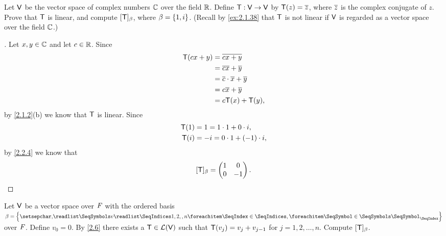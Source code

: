 \begin{ex}\label{ex:2.2.9}
  Let \(\mathsf{V}\) be the vector space of complex numbers \(\mathbb{C}\) over the field \(\mathbb{R}\).
  Define \(\mathsf{T} : \mathsf{V} \to \mathsf{V}\) by \(\mathsf{T}(z) = \overline{z}\), where \(\overline{z}\) is the complex conjugate of \(z\).
  Prove that \(\mathsf{T}\) is linear, and compute \([\mathsf{T}]_{\beta}\), where \(\beta = \left\lbrace1, i\right\rbrace\).
  (Recall by \cref{ex:2.1.38} that \(\mathsf{T}\) is not linear if \(\mathsf{V}\) is regarded as a vector space over the field \(\mathbb{C}\).)
\end{ex}

\begin{proof}[]
  Let \(x, y \in \mathbb{C}\) and let \(c \in \mathbb{R}\).
  Since
  \begin{align*}
    \mathsf{T}(cx + y) & = \overline{cx + y}                      \\
               & = \overline{cx} + \overline{y}               \\
               & = \overline{c} \cdot \overline{x} + \overline{y} \\
               & = c \overline{x} + \overline{y}              \\
               & = c \mathsf{T}(x) + \mathsf{T}(y),
  \end{align*}
  by \cref{2.1.2}(b) we know that \(\mathsf{T}\) is linear.
  Since
  \begin{align*}
    \mathsf{T}(1) & = 1 = 1 \cdot 1 + 0 \cdot i,     \\
    \mathsf{T}(i) & = -i = 0 \cdot 1 + (-1) \cdot i,
  \end{align*}
  by \cref{2.2.4} we know that
  \[
    [\mathsf{T}]_{\beta} = \begin{pmatrix}
      1 & 0  \\
      0 & -1
    \end{pmatrix}.
  \]
\end{proof}

\begin{ex}\label{ex:2.2.10}
  Let \(\mathsf{V}\) be a vector space over \(\mathit{F}\) with the ordered basis \(\beta = \set{\seq{v}{1,2,,n}}\) over \(\mathit{F}\).
  Define \(v_0 = 0\).
  By \cref{2.6} there exists a \(\mathsf{T} \in \mathcal{L}(\mathsf{V})\) such that \(\mathsf{T}(v_j) = v_j + v_{j - 1}\) for \(j = 1, 2, \dots, n\).
  Compute \([\mathsf{T}]_{\beta}\).
\end{ex}

